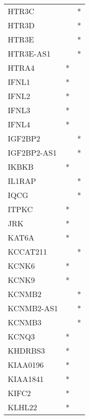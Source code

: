 \begin{longtable}{lcc}
HTR3C            &                &          * \\
HTR3D            &                &          * \\
HTR3E            &                &          * \\
HTR3E-AS1        &                &          * \\
HTRA4            &              * &            \\
IFNL1            &              * &            \\
IFNL2            &              * &            \\
IFNL3            &              * &            \\
IFNL4            &              * &            \\
IGF2BP2          &                &          * \\
IGF2BP2-AS1      &                &          * \\
IKBKB            &              * &            \\
IL1RAP           &                &          * \\
IQCG             &                &          * \\
ITPKC            &              * &            \\
JRK              &              * &            \\
KAT6A            &              * &            \\
KCCAT211         &                &          * \\
KCNK6            &              * &            \\
KCNK9            &              * &            \\
KCNMB2           &                &          * \\
KCNMB2-AS1       &                &          * \\
KCNMB3           &                &          * \\
KCNQ3            &              * &            \\
KHDRBS3          &              * &            \\
KIAA0196         &              * &            \\
KIAA1841         &              * &            \\
KIFC2            &              * &            \\
KLHL22           &              * &            \\

\end{longtable}

